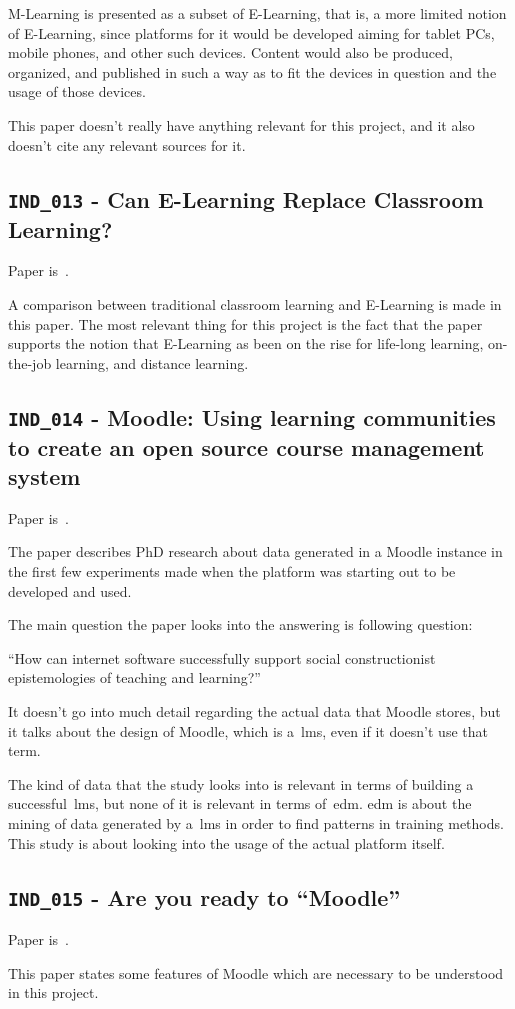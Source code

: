 M-Learning is presented as a subset of E-Learning, that is, a more limited
notion of E-Learning, since platforms for it would be developed aiming for
tablet PCs, mobile phones, and other such devices. Content would also be
produced, organized, and published in such a way as to fit the devices in
question and the usage of those devices.

This paper doesn't really have anything relevant for this project, and it also
doesn't cite any relevant sources for it.

\subsection{\texttt{IND\_013} - Can E-Learning Replace Classroom Learning?}

Paper is~\cite{ind_013}.

A comparison between traditional classroom learning and E-Learning is made in
this paper. The most relevant thing for this project is the fact that the paper
supports the notion that E-Learning as been on the rise for life-long learning,
on-the-job learning, and distance learning.

\subsection{\texttt{IND\_014} - Moodle: Using learning communities to create an
open source course management system}

Paper is~\cite{ind_014}.

The paper describes PhD research about data generated in a Moodle instance in
the first few experiments made when the platform was starting out to be
developed and used.

The main question the paper looks into the answering is following question:

``How can internet software successfully support social constructionist
epistemologies of teaching and learning?''

It doesn't go into much detail regarding the actual data that Moodle stores,
but it talks about the design of Moodle, which is a~\gls{lms}, even if it
doesn't use that term.

The kind of data that the study looks into is relevant in terms of building a
successful~\gls{lms}, but none of it is relevant in terms of~\gls{edm}.
\gls{edm} is about the mining of data generated by a~\gls{lms} in order to find
patterns in training methods. This study is about looking into the usage of the
actual platform itself.

\subsection{\texttt{IND\_015} - Are you ready to “Moodle”}

Paper is~\cite{ind_015}.

This paper states some features of Moodle which are necessary to be understood
in this project.
